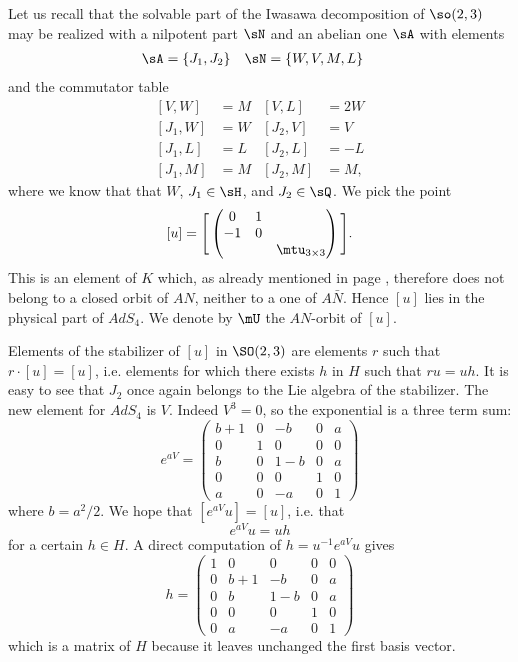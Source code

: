 Let us recall that the solvable part of the Iwasawa decomposition of $\so(2,3)$ may be realized with a nilpotent part $\sN$ and an abelian one $\sA$  with elements
\begin{subequations}
	\begin{align}
		\sA & =\{ J_1, J_2\} & \sN & =\{W,V,M,L\}
	\end{align}
\end{subequations}
and the commutator table
\begin{subequations}    \label{EqTableRappelSO}
	\begin{align}
		[V,W]    & =M & [V,L]    & =2W \\
		[ J_1,W] & =W & [ J_2,V] & =V  \\
		[ J_1,L] & =L & [ J_2,L] & =-L \\
		[ J_1,M] & =M & [ J_2,M] & =M,
	\end{align}
\end{subequations}
where we know that that $W$, $J_{1}\in\sH$, and $J_{2}\in\sQ$. We pick the point
\[
	[u]=
	\Bigg[
		\begin{pmatrix}
			0  & 1                    \\
			-1 & 0                    \\
			   &   & \mtu_{3\times 3}
		\end{pmatrix}
		\Bigg].
\]
This is an element of $K$ which, as already mentioned in page \pageref{PgNoticeKpassung}, therefore does not belong to a closed orbit of $AN$, neither to a one of $A\bar N$. Hence $[u]$ lies in the physical part of $AdS_4$. We denote by $\mU$ the $AN$-orbit of $[u]$.

Elements of the stabilizer of $[u]$ in $\SO(2,3)$ are elements $r$ such that $r\cdot[u]=[u]$, i.e. elements for which there exists  $h$ in $H$ such that $ru=uh$. It is easy to see that $J_{2}$ once again belongs to the Lie algebra of the stabilizer. The new element for $AdS_{4}$ is $V$. Indeed $V^{3}=0$, so the exponential is a three term sum:
\[
	e^{aV}=
	\begin{pmatrix}
		b+1 & 0 & -b  & 0 & a \\
		0   & 1 & 0   & 0 & 0 \\
		b   & 0 & 1-b & 0 & a \\
		0   & 0 & 0   & 1 & 0 \\
		a   & 0 & -a  & 0 & 1
	\end{pmatrix}
\]
where $b=a^{2}/2$. We hope that $[ e^{aV}u]=[u]$, i.e. that
\[
	e^{aV}u=uh
\]
for a certain $h\in H$. A direct computation of $h=u^{-1} e^{aV}u$ gives
\[
	h=
	\begin{pmatrix}
		1 & 0   & 0   & 0 & 0 \\
		0 & b+1 & -b  & 0 & a \\
		0 & b   & 1-b & 0 & a \\
		0 & 0   & 0   & 1 & 0 \\
		0 & a   & -a  & 0 & 1
	\end{pmatrix}
\]
which is a matrix of $H$ because it leaves unchanged the first basis vector.

